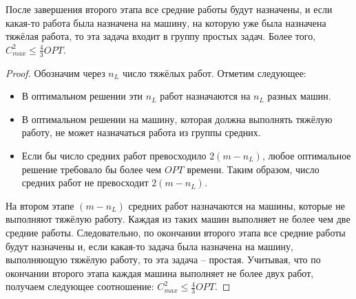 \begin{lemma}
    После завершения второго этапа все средние работы будут назначены, и если какая-то работа была назначена на машину, на которую уже была назначена тяжёлая работа, то эта задача входит в группу простых задач. Более того, $C_{max}^{2} \leq \frac{4}{3}OPT$.
\end{lemma}
\begin{proof}
    Обозначим через $n_{L}$ число тяжёлых работ. Отметим следующее:
    \begin{itemize}
        \item В оптимальном решении эти $n_{L}$ работ назначаются на $n_{L}$ разных машин.
        \item В оптимальном решении на машину, которая должна выполнять тяжёлую работу, не может назначаться работа из группы средних. 
        \item Если бы число средних работ превосходило $2(m - n_{L})$, любое оптимальное решение требовало бы более чем $OPT$ времени. Таким образом, число средних работ не превосходит $2(m - n_{L})$.
    \end{itemize}
     На втором этапе $(m - n_{L})$ средних работ назначаются на машины, которые не выполняют тяжёлую работу. Каждая из таких машин выполняет не более чем две средние работы. Следовательно, по окончании второго этапа все средние работы будут назначены и, если какая-то задача была назначена на машину, выполняющую тяжёлую работу, то эта задача -- простая. Учитывая, что по окончании второго этапа каждая машина выполняет не более двух работ, получаем следующее соотношение:  $C_{max}^{2} \leq \frac{4}{3}OPT$.
\end{proof}
    
